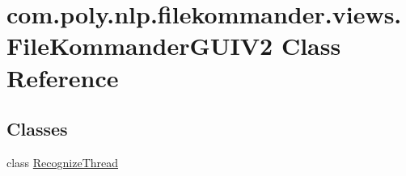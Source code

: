 \hypertarget{classcom_1_1poly_1_1nlp_1_1filekommander_1_1views_1_1_file_kommander_g_u_i_v2}{\section{com.\-poly.\-nlp.\-filekommander.\-views.\-File\-Kommander\-G\-U\-I\-V2 Class Reference}
\label{classcom_1_1poly_1_1nlp_1_1filekommander_1_1views_1_1_file_kommander_g_u_i_v2}
}
\subsection*{Classes}
\begin{DoxyCompactItemize}
\item 
class \hyperlink{classcom_1_1poly_1_1nlp_1_1filekommander_1_1views_1_1_file_kommander_g_u_i_v2_1_1_recognize_thread}{Recognize\-Thread}
\end{DoxyCompactItemize}
